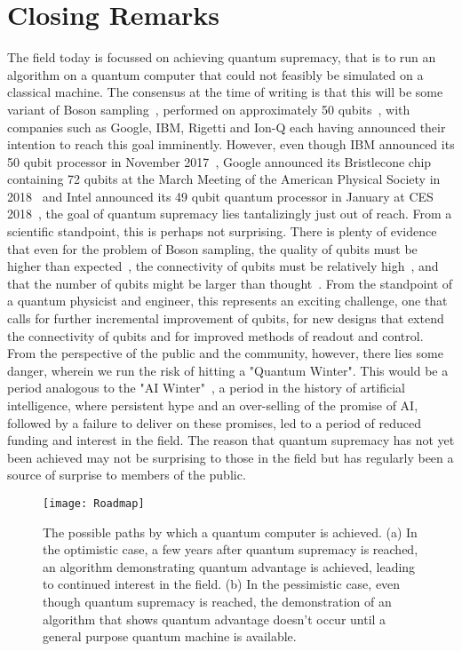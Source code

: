\section{Closing Remarks}
The field today is focussed on achieving quantum supremacy, that is to run an algorithm on a quantum computer that could not feasibly be
simulated on a classical machine. The consensus at the time of writing is that this will be some variant of Boson sampling~\cite{Aaronson:2011},
performed on approximately 50 qubits~\cite{savage,8322045,10.1038/s41567-018-0131-y}, with companies such as Google, IBM, Rigetti and Ion-Q each having
announced their intention to reach this goal imminently. However, even though IBM announced its 50 qubit processor in November 2017~\cite{ibmq}, Google announced
its Bristlecone chip containing 72 qubits at the March Meeting of the American Physical Society in 2018~\cite{bristlecone,Neill195} and Intel announced
its 49 qubit quantum processor in January at CES 2018~\cite{intelq}, the goal of quantum supremacy lies tantalizingly just out of reach. From a scientific standpoint,
this is perhaps not surprising. There is plenty of evidence that even for the problem of Boson sampling, the quality of qubits must be higher
than expected~\cite{PhysRevX.6.021039,PhysRevLett.117.080501}, the connectivity of qubits must be relatively high~\cite{s41567-018-0124-x},
and that the number of qubits might be larger than thought~\cite{2017arXiv171005867P}.
From the standpoint of a quantum physicist and engineer, this represents an exciting challenge, one that calls for further incremental improvement of qubits,
for new designs that extend the connectivity of qubits and for improved methods of readout and control. From the perspective of the public and the community, however,
there lies some danger, wherein we run the risk of hitting a "Quantum Winter". This would be a period analogous to the "AI Winter"~\cite{crevier1993ai},
a period in the history of artificial intelligence, where persistent hype and an over-selling of the promise of AI, followed by a failure to deliver on these promises,
led to a period of reduced funding and interest in the field. The reason that quantum supremacy has not yet been achieved may not be surprising to those in the
field but has regularly been a source of surprise to members of the public.

\begin{figure}
    \texttt{[image: Roadmap]}
    \caption[Roadmap to a quantum computer]{\label{fig:roadmap} The possible paths by which a quantum computer is achieved. (a) In the optimistic case,
    a few years after quantum supremacy is reached, an algorithm demonstrating quantum advantage is achieved, leading to continued interest in the field. (b) In the pessimistic case,
    even though quantum supremacy is reached, the demonstration of an algorithm that shows quantum advantage doesn't occur until a general purpose quantum machine is available.}
\end{figure}

